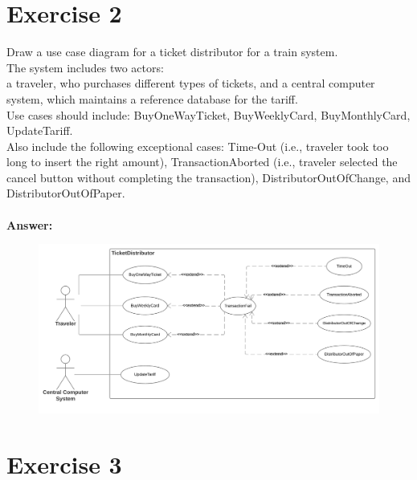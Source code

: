\documentclass[a4paper]{article}
\begin{document}
\section{Exercise 2}
Draw a use case diagram for a ticket distributor for a train system. \\
The system includes two actors: \\
a traveler, who purchases different types of tickets, and a central computer system, which maintains a reference database for the tariff. \\
Use cases should include: BuyOneWayTicket, BuyWeeklyCard, BuyMonthlyCard, UpdateTariff. \\
Also include the following exceptional cases: Time-Out (i.e., traveler took too long to insert the right amount), TransactionAborted (i.e., traveler selected the cancel button without completing the transaction), DistributorOutOfChange, and DistributorOutOfPaper. \\
\\
\textbf{Answer:}
\begin{figure}[H]
\includegraphics[width=\textwidth]{UseCaseDiagram}
\centering
\end{figure}

\section{Exercise 3}
\end{document}
